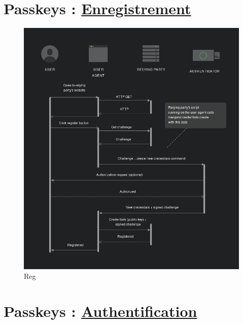 \hypertarget{passkeys-enregistrement32}{%
\section{\texorpdfstring{Passkeys :
\href{https://www.freecodecamp.org/news/intro-to-webauthn/}{Enregistrement}}{Passkeys : Enregistrement}}\label{passkeys-enregistrement32}}

\begin{figure}
\centering
\includegraphics{src/img/Registration.png}
\caption{Reg}
\end{figure}

\hypertarget{passkeys-authentification32}{%
\section{\texorpdfstring{Passkeys :
\href{https://www.freecodecamp.org/news/intro-to-webauthn/}{Authentification}}{Passkeys : Authentification}}\label{passkeys-authentification32}}

